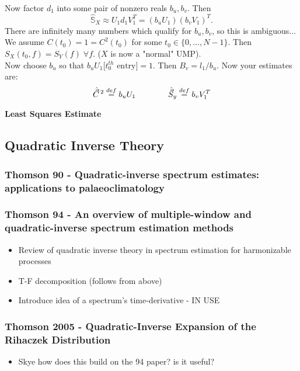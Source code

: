 \documentclass{article}
\begin{document}
{Now factor $d_1$ into some pair of nonzero reals $b_u, b_v$. Then
\[\hat {\mathbb S}_X \approx U_1 d_1 V_1^T = (b_uU_1)(b_vV_1)^T.\]
There are infinitely many numbers which qualify for $b_u, b_v$, so this is ambiguous...
We assume $C(t_0) = 1 = C^2(t_0)$ for some $t_0 \in \{0, \dots, N-1\}$. 
Then $S_X(t_0, f) = S_Y(f) \; \forall f$. ($X$ is now a "normal" UMP). \\

Now choose $b_u$ so that $b_uU_1\Big[t_0^{th} \text{ entry}\Big] = 1$. Then $B_v = l_1/b_u$. Now your estimates are:
\[\hat{\vec{C}}^{\,2} \stackrel{\small def}{=} b_uU_1 \qquad\qquad \hat{\vec S}_y \stackrel{\small def}{=} b_vV_1^T\]

\textbf{Least Squares Estimate}}


\subsection{Quadratic Inverse Theory}
\subsubsection{Thomson 90 - Quadratic-inverse spectrum estimates: applications to palaeoclimatology}

\subsubsection{Thomson 94 - An overview of multiple-window and quadratic-inverse spectrum estimation methods}
\begin{itemize}
    \item Review of quadratic inverse theory in spectrum estimation for harmonizable processes
    \item T-F decomposition (follows from above)
    \item Introduce idea of a spectrum’s time-derivative - IN USE
\end{itemize}

\subsubsection{Thomson 2005 - Quadratic-Inverse Expansion of the Rihaczek Distribution}
\begin{itemize}
    \item Skye how does this build on the 94 paper? is it useful?
\end{itemize}
\end{document}
